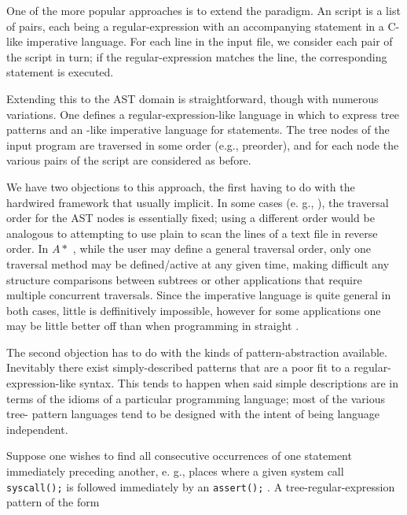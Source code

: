 
One of the more popular approaches is to extend the  \cite{AKW86}
paradigm. An  script is a list of pairs, each being a
regular-expression with an accompanying statement in a C-like imperative
language. For each line in the input file, we consider each pair of the script
in turn; if the regular-expression matches the line, the corresponding statement
is executed.

Extending this to the AST domain is straightforward, though with numerous
variations. One defines a regular-expression-like language in which to express
tree patterns and an -like imperative language for statements. The
tree nodes of the input program are traversed in some order (e.g., preorder),
and for each node the various pairs of the script are considered as before.

We have two objections to this approach, the first having to do with the
hardwired framework that usually implicit. In some cases (e. g., 
\cite{GA96}), the traversal order for the AST nodes is essentially fixed; using
a different order would be analogous to attempting to use plain  to
scan the lines of a text file in reverse order. In $A*$ \cite{LR95}, while the
user may define a general traversal order, only one traversal method may be
defined/active at any given time, making difficult any structure comparisons
between subtrees or other applications that require multiple concurrent
traversals. Since the imperative language is quite general in both cases, little
is deffinitively impossible, however for some applications one may be little
better off than when programming in straight \ci.

The second objection has to do with the kinds of pattern-abstraction available.
Inevitably there exist simply-described patterns that are a poor fit to a
regular-expression-like syntax. This tends to happen when said simple
descriptions are in terms of the idioms of a particular programming language;
most of the various tree- pattern languages tend to be designed with
the intent of being language independent.

Suppose one wishes to find all consecutive occurrences of one statement
immediately preceding another, e. g., places where a given system call
\verb|syscall();| is followed immediately by an \verb|assert();| . A tree-regular-expression pattern of the
form

